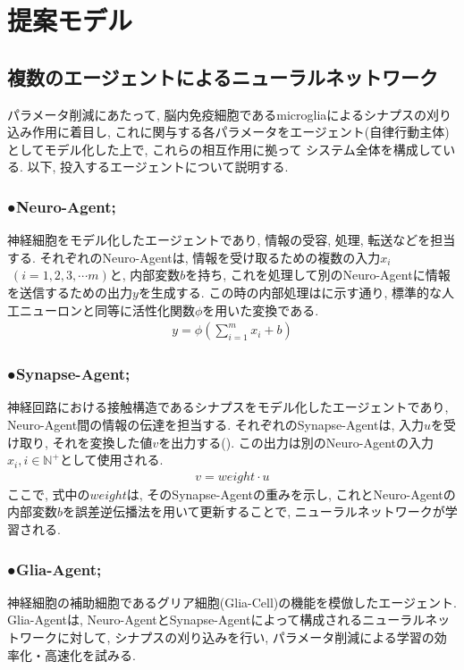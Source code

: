 \documentclass[a4paper, 9pt,twocolumn,dvipdfmx]{jsarticle}
\begin{document}
\section{提案モデル}
\subsection{複数のエージェントによるニューラルネットワーク}
パラメータ削減にあたって, 脳内免疫細胞であるmicrogliaによるシナプスの刈り込み作用に着目し, 
これに関与する各パラメータをエージェント(自律行動主体)としてモデル化した上で, これらの相互作用に拠って
システム全体を構成している. 
以下, 投入するエージェントについて説明する.
\vspace{2mm}
  \subsubsection*{●Neuro-Agent;\,\,}
  神経細胞をモデル化したエージェントであり, 情報の受容, 処理, 
  転送などを担当する.
  それぞれのNeuro-Agentは, 情報を受け取るための複数の入力$x_i$ $\;(i= 1, 2, 3, \cdots m)$と, 
  内部変数$b$を持ち, 
  これを処理して別のNeuro-Agentに情報を送信するための出力$y$を生成する.
  この時の内部処理はに示す通り, 
  標準的な人工ニューロンと同等に活性化関数$\phi$を用いた変換である.
  \begin{align}
    y=\phi(\sum_{i=1}^m x_i+b)
    \label{eq:Neuro-Agent}
  \end{align}
  \subsubsection*{●Synapse-Agent;\,\,}
  神経回路における接触構造であるシナプスをモデル化したエージェントであり, 
  Neuro-Agent間の情報の伝達を担当する.
  それぞれのSynapse-Agentは, 入力$u$を受け取り, それを変換した値$v$を出力する(). 
  この出力は別のNeuro-Agentの入力$x_i, i\in\mathbb{N}^+$として使用される.
  \begin{align}
    v=weight\cdot u
 \label{eq:Synapse-Agent}   
  \end{align}
  ここで, 式中の$weight$は, そのSynapse-Agentの重みを示し, 
  これとNeuro-Agentの内部変数$b$を誤差逆伝播法を用いて更新することで, ニューラルネットワークが学習される.
  \vspace{2mm}
  \subsubsection*{●Glia-Agent;\,\,}
  神経細胞の補助細胞であるグリア細胞(Glia-Cell)の機能を模倣したエージェント.
  Glia-Agentは, Neuro-AgentとSynapse-Agentによって構成されるニューラルネットワークに対して,
  シナプスの刈り込みを行い, パラメータ削減による学習の効率化・高速化を試みる. 
  \vspace{2mm}
\end{document}

